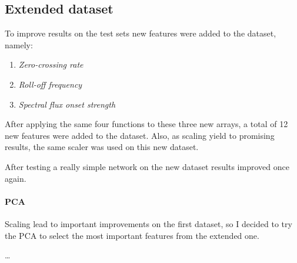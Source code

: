 \subsection{Extended dataset}
To improve results on the test sets new features were added 
to the dataset, namely: 
\begin{enumerate}
    \item \emph{Zero-crossing rate}
    \item \emph{Roll-off frequency}
    \item \emph{Spectral flux onset strength}
\end{enumerate}
After applying the same four functions to these three new arrays, 
a total of 12 new features were added to the dataset.
Also, as scaling yield to promising results, 
the same scaler was used on this new dataset. 

After testing a really simple network on the new dataset 
results improved once again.

\paragraph{PCA}
Scaling lead to important improvements on the first dataset, 
so I decided to try the PCA to select the most important
features from the extended one.

\dots
